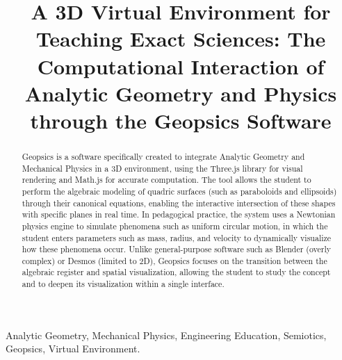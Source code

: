 \documentclass[conference,a4paper]{IEEEtran}
\begin{document}
\title{A 3D Virtual Environment for Teaching Exact Sciences: The Computational Interaction of Analytic Geometry and Physics through the Geopsics Software}

\author{
\and
{}
}

\maketitle

\begin{abstract}
Geopsics is a software specifically created to integrate Analytic Geometry and Mechanical Physics in a 3D environment, using the Three.js library for visual rendering and Math.js for accurate computation. The tool allows the student to perform the algebraic modeling of quadric surfaces (such as paraboloids and ellipsoids) through their canonical equations, enabling the interactive intersection of these shapes with specific planes in real time. In pedagogical practice, the system uses a Newtonian physics engine to simulate phenomena such as uniform circular motion, in which the student enters parameters such as mass, radius, and velocity to dynamically visualize how these phenomena occur. Unlike general-purpose software such as Blender (overly complex) or Desmos (limited to 2D), Geopsics focuses on the transition between the algebraic register and spatial visualization, allowing the student to study the concept and to deepen its visualization within a single interface.
\end{abstract}

\begin{IEEEkeywords}
Analytic Geometry, Mechanical Physics, Engineering Education, Semiotics, Geopsics, Virtual Environment.
\end{IEEEkeywords}
\end{document}
